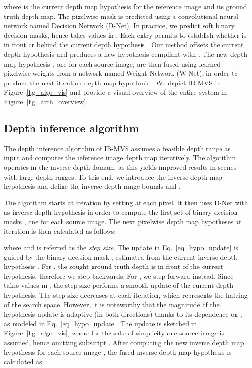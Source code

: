 \documentclass{bmvc2k}
\begin{document}
where  is the current depth map hypothesis for the reference image and  its ground truth depth map.
The pixelwise mask  is predicted using a convolutional neural network named Decision Network (D-Net). 
In practice, we predict soft binary decision masks, hence  takes values in .
Each entry  permits to establish whether  is in front or behind the current depth hypothesis .
Our method offsets the current depth hypothesis  and produces a new hypothesis  compliant with .
The  new depth map hypothesis , one for each source image, are then fused using learned pixelwise weights from a network named Weight Network (W-Net), in order to produce the next iteration depth map hypothesis .
We depict IB-MVS in Figure~\ref{fig_algo_vis} and provide a visual overview of the entire system in Figure~\ref{fig_arch_overview}.
\subsection{Depth inference algorithm} \label{sec_method_inference}
The depth inference algorithm of IB-MVS assumes a feasible depth range  as input and computes the reference image depth map  iteratively.
The algorithm operates in the inverse depth domain, as this yields improved results in scenes with large depth ranges.
To this end, we introduce the inverse depth map hypothesis  and define the inverse depth range bounds  and .

The algorithm starts at iteration  by setting  at each pixel.
It then uses D-Net with  as inverse depth hypothesis in order to compute the first set of binary decision masks , one for each source image.
The next pixelwise depth map hypotheses at iteration  is then calculated as follows:

where  and  is referred as the \textit{step size}.
The update in Eq.~\eqref{eq_hypo_update} is guided by the binary decision mask , estimated from the current inverse depth hypothesis .
For , the sought ground truth depth is in front of the current hypothesis, therefore we step backwards.
For , we step forward instead.
Since  takes values in , the step size performs a smooth update of the current depth hypothesis.
The step size  decreases at each iteration, which represents the halving of the search space.
However, it is noteworthy that the magnitude of the hypothesis update is adaptive (in both directions) thanks to its dependence on , as modeled in Eq.~\eqref{eq_hypo_update}.
The update is sketched in Figure~\ref{fig_algo_vis}, where for the sake of simplicity one source image is assumed, hence omitting subscript .
After computing the new inverse depth map hypothesis  for each source image , the fused inverse depth map hypothesis  is calculated as:
 
\end{document}
